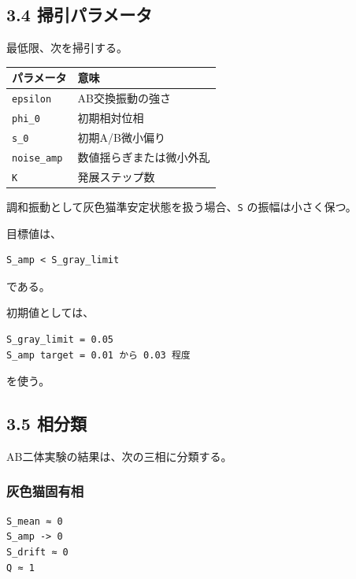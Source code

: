 \documentclass{article}
\newcounter{none}
\begin{document}
\subsection{3.4
掃引パラメータ}\label{ux6383ux5f15ux30d1ux30e9ux30e1ux30fcux30bf}

最低限、次を掃引する。

{\def\LTcaptype{none} %
\begin{longtable}[]{@{}ll@{}}
\toprule\noalign{}
パラメータ & 意味 \\
\midrule\noalign{}
\endhead
\bottomrule\noalign{}
\endlastfoot
\texttt{epsilon} & AB交換振動の強さ \\
\texttt{phi\_0} & 初期相対位相 \\
\texttt{s\_0} & 初期A/B微小偏り \\
\texttt{noise\_amp} & 数値揺らぎまたは微小外乱 \\
\texttt{K} & 発展ステップ数 \\
\end{longtable}
}

調和振動として灰色猫準安定状態を扱う場合、\texttt{S}
の振幅は小さく保つ。

目標値は、

\begin{verbatim}
S_amp < S_gray_limit
\end{verbatim}

である。

初期値としては、

\begin{verbatim}
S_gray_limit = 0.05
S_amp target = 0.01 から 0.03 程度
\end{verbatim}

を使う。

\subsection{3.5 相分類}\label{ux76f8ux5206ux985e}

AB二体実験の結果は、次の三相に分類する。

\subsubsection{灰色猫固有相}\label{ux7070ux8272ux732bux56faux6709ux76f8}

\begin{verbatim}
S_mean ≈ 0
S_amp -> 0
S_drift ≈ 0
Q ≈ 1
\end{verbatim}
\end{document}
